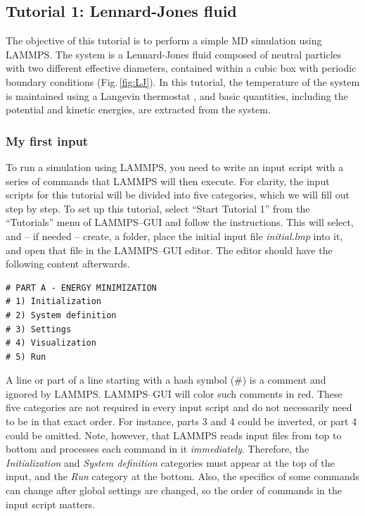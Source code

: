 \documentclass[9pt,tutorial]{livecoms}
\begin{document}
\subsection{Tutorial 1: Lennard-Jones fluid}
\label{lennard-jones-label}

The objective of this tutorial is to perform a simple MD simulation
using LAMMPS.  The system is a Lennard-Jones fluid composed of neutral
particles with two different effective diameters, contained within a
cubic box with periodic boundary conditions (Fig.\,\ref{fig:LJ}).  In
this tutorial, the temperature of the system is maintained using a
Langevin thermostat \cite{schneider1978molecular}, and basic quantities,
including the potential and kinetic energies, are extracted from the
system.

\subsubsection{My first input}

To run a simulation using LAMMPS, you need to write an input script with
a series of commands that LAMMPS will then execute.  For clarity, the
input scripts for this tutorial will be divided into five categories,
which we will fill out step by step.  To set up this tutorial, select
``Start Tutorial 1'' from the ``Tutorials'' menu of LAMMPS--GUI and
follow the instructions.  This will select, and -- if needed -- create,
a folder, place the initial input file \textit{initial.lmp} into it, and
open that file in the LAMMPS--GUI editor.  The editor should have the
following content afterwards.
{\normalsize
\begin{verbatim}
# PART A - ENERGY MINIMIZATION
# 1) Initialization
# 2) System definition
# 3) Settings
# 4) Visualization
# 5) Run
\end{verbatim}
}

A line or part of a line starting with a hash symbol ($\#$) is a comment
and ignored by LAMMPS.  LAMMPS--GUI will color such comments in red.
These five categories are not required in every input script and do not
necessarily need to be in that exact order.  For instance, parts 3 and 4
could be inverted, or part 4 could be omitted.  Note, however, that
LAMMPS reads input files from top to bottom and processes each command
in it \emph{immediately}.  Therefore, the \textit{Initialization} and
\textit{System definition} categories must appear at the top of the
input, and the \textit{Run} category at the bottom.  Also, the specifics
of some commands can change after global settings are changed, so the
order of commands in the input script matters.
\end{document}
